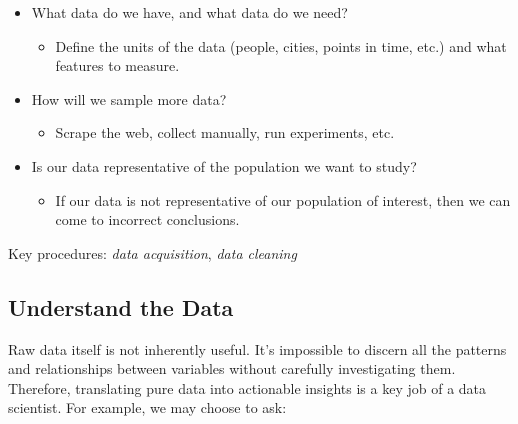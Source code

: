 \documentclass[
  letterpaper,
  DIV=11,
  numbers=noendperiod]{scrreprt}
\providecommand{\tightlist}{%
  \setlength{\itemsep}{0pt}\setlength{\parskip}{0pt}}\usepackage{longtable,booktabs,array}
\begin{document}
\begin{itemize}
\tightlist
\item
  What data do we have, and what data do we need?

  \begin{itemize}
  \tightlist
  \item
    Define the units of the data (people, cities, points in time, etc.)
    and what features to measure.
  \end{itemize}
\item
  How will we sample more data?

  \begin{itemize}
  \tightlist
  \item
    Scrape the web, collect manually, run experiments, etc.
  \end{itemize}
\item
  Is our data representative of the population we want to study?

  \begin{itemize}
  \tightlist
  \item
    If our data is not representative of our population of interest,
    then we can come to incorrect conclusions.
  \end{itemize}
\end{itemize}

Key procedures: \emph{data acquisition}, \emph{data cleaning}

\subsection{Understand the Data}\label{understand-the-data}

Raw data itself is not inherently useful. It's impossible to discern all
the patterns and relationships between variables without carefully
investigating them. Therefore, translating pure data into actionable
insights is a key job of a data scientist. For example, we may choose to
ask:
\end{document}

